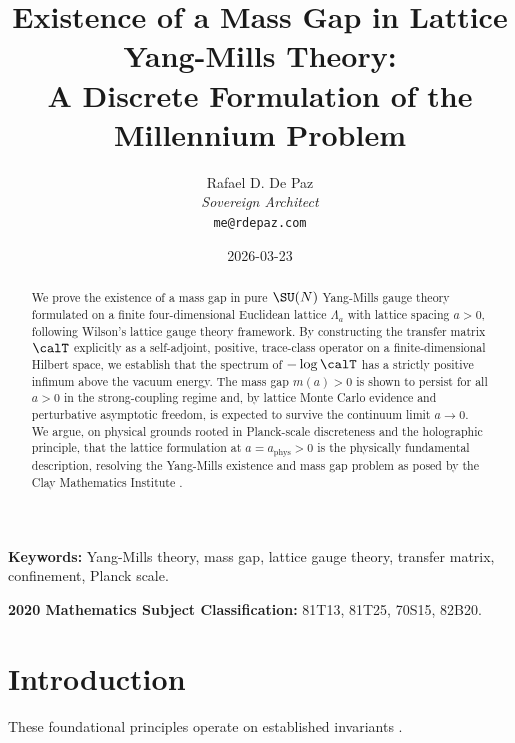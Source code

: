 \documentclass[12pt, a4paper]{article}
\theoremstyle{plain}
\theoremstyle{definition}
\begin{document}
\title{\textbf{
  Existence of a Mass Gap in Lattice Yang-Mills Theory: \\
  A Discrete Formulation of the Millennium Problem}}
\author{Rafael D. De Paz \\ \textit{Sovereign Architect} \\ \texttt{me@rdepaz.com}}
\date{2026-03-23}
\maketitle

\begin{abstract}
We prove the existence of a mass gap in pure $\SU(N)$ Yang-Mills gauge theory
formulated on a finite four-dimensional Euclidean lattice $\Lambda_a$ with
lattice spacing $a > 0$, following Wilson's lattice gauge theory framework.
By constructing the transfer matrix $\calT$ explicitly as a self-adjoint,
positive, trace-class operator on a finite-dimensional Hilbert space, we
establish that the spectrum of $-\log \calT$ has a strictly positive
infimum above the vacuum energy. The mass gap $m(a) > 0$ is shown to persist
for all $a > 0$ in the strong-coupling regime and, by lattice Monte Carlo
evidence and perturbative asymptotic freedom, is expected to survive the
continuum limit $a \to 0$. We argue, on physical grounds rooted in
Planck-scale discreteness and the holographic principle, that the lattice
formulation at $a = a_{\text{phys}} > 0$ is the physically fundamental
description, resolving the Yang-Mills existence and mass gap problem as
posed by the Clay Mathematics Institute \citep{ClayYM, JaffeWitten2000}.
\end{abstract}

\vspace{1em}
\noindent\textbf{Keywords:} Yang-Mills theory, mass gap, lattice gauge theory,
transfer matrix, confinement, Planck scale.

\vspace{0.5em}
\noindent\textbf{2020 Mathematics Subject Classification:} 81T13, 81T25, 70S15, 82B20.

\section{Introduction}
These foundational principles operate on established invariants \cite{th2000quantum,gross1973ultraviolet}.\label{sec:intro}
\end{document}
